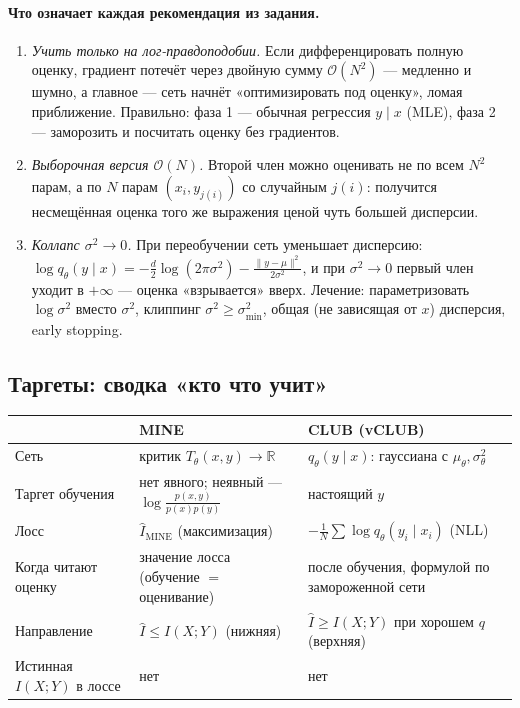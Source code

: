\documentclass[11pt]{article}
\newcommand{\MI}{I(X;Y)}
\begin{document}
\paragraph{Что означает каждая рекомендация из задания.}

\begin{enumerate}[label=\arabic*.]
\item \emph{Учить только на лог-правдоподобии.} Если дифференцировать полную оценку, градиент потечёт через двойную сумму $\mathcal{O}(N^2)$ — медленно и шумно, а главное — сеть начнёт «оптимизировать под оценку», ломая приближение. Правильно: фаза 1 — обычная регрессия $y\mid x$ (MLE), фаза 2 — заморозить и посчитать оценку без градиентов.
\item \emph{Выборочная версия $\mathcal{O}(N)$.} Второй член можно оценивать не по всем $N^2$ парам, а по $N$ парам $(x_i, y_{j(i)})$ со случайным $j(i)$: получится несмещённая оценка того же выражения ценой чуть большей дисперсии.
\item \emph{Коллапс $\sigma^2\to0$.} При переобучении сеть уменьшает дисперсию: $\log q_\theta(y\mid x)=-\tfrac{d}{2}\log(2\pi\sigma^2)-\frac{\|y-\mu\|^2}{2\sigma^2}$, и при $\sigma^2\to0$ первый член уходит в $+\infty$ — оценка «взрывается» вверх. Лечение: параметризовать $\log\sigma^2$ вместо $\sigma^2$, клиппинг $\sigma^2\ge\sigma^2_{\min}$, общая (не зависящая от $x$) дисперсия, early stopping.
\end{enumerate}

\subsection{Таргеты: сводка «кто что учит»}

\begin{center}
\small
\begin{tabular}{@{}p{3.1cm}p{5.6cm}p{5.8cm}@{}}
\toprule
 & MINE & CLUB (vCLUB) \\
\midrule
Сеть & критик $T_\theta(x,y)\to\mathbb{R}$ & $q_\theta(y\mid x)$: гауссиана с $\mu_\theta,\sigma^2_\theta$ \\
Таргет обучения & нет явного; неявный — $\log\frac{p(x,y)}{p(x)p(y)}$ & настоящий $y$ \\
Лосс & $\hat I_{\text{MINE}}$ (максимизация) & $-\frac1N\sum\log q_\theta(y_i\mid x_i)$ (NLL) \\
Когда читают оценку & значение лосса (обучение $=$ оценивание) & после обучения, формулой по замороженной сети \\
Направление & $\hat I\le\MI$ (нижняя) & $\hat I\ge\MI$ при хорошем $q$ (верхняя) \\
Истинная $\MI$ в лоссе & нет & нет \\
\bottomrule
\end{tabular}
\end{center}
\end{document}
